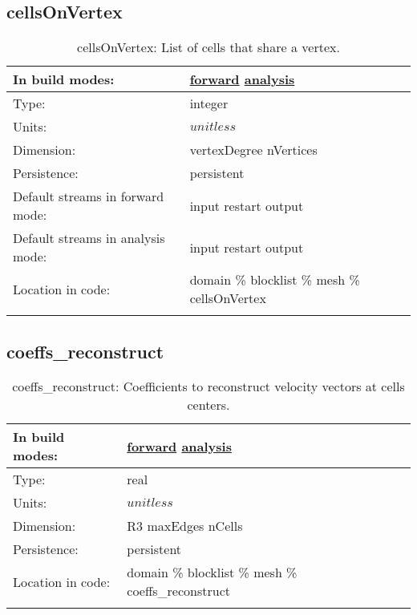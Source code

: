 \subsection[cellsOnVertex]{cellsOnVertex}
\label{subsec:var_sec_mesh_cellsOnVertex}
\begin{center}
\begin{longtable}{| p{2.0in} | p{4.0in} |}
        \hline 
        In build modes: & \hyperref[subsec:forward_var_tab_mesh]{forward} \hyperref[subsec:analysis_var_tab_mesh]{analysis} \\
        \hline 
        Type: & integer \\
        \hline 
        Units: & $unitless$ \\
        \hline 
        Dimension: & vertexDegree nVertices \\
        \hline 
        Persistence: & persistent \\
        \hline 
		 Default streams in forward mode: &  input restart output \\
        \hline 
		 Default streams in analysis mode: &  input restart output \\
        \hline 
		 Location in code: & domain \% blocklist \% mesh \% cellsOnVertex \\
		 \hline 
    \caption{cellsOnVertex: List of cells that share a vertex.}
\end{longtable}
\end{center}
\subsection[coeffs\_reconstruct]{coeffs\_reconstruct}
\label{subsec:var_sec_mesh_coeffs_reconstruct}
\begin{center}
\begin{longtable}{| p{2.0in} | p{4.0in} |}
        \hline 
        In build modes: & \hyperref[subsec:forward_var_tab_mesh]{forward} \hyperref[subsec:analysis_var_tab_mesh]{analysis} \\
        \hline 
        Type: & real \\
        \hline 
        Units: & $unitless$ \\
        \hline 
        Dimension: & R3 maxEdges nCells \\
        \hline 
        Persistence: & persistent \\
        \hline 
		 Location in code: & domain \% blocklist \% mesh \% coeffs\_reconstruct \\
		 \hline 
    \caption{coeffs\_reconstruct: Coefficients to reconstruct velocity vectors at cells centers.}
\end{longtable}
\end{center}
